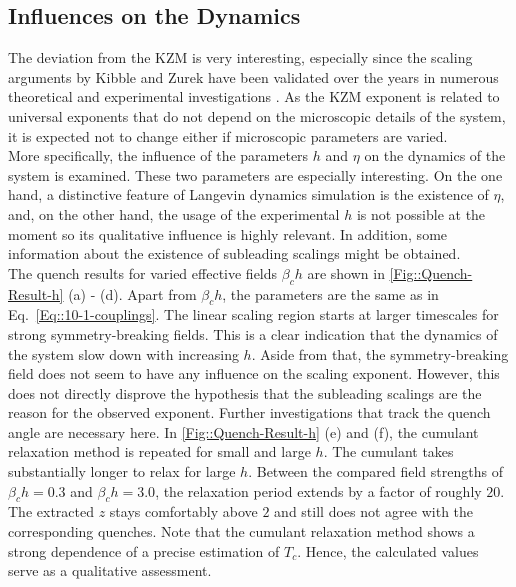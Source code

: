 	\subsection{Influences on the Dynamics}
	The deviation from the KZM is very interesting, especially since the scaling arguments by Kibble and Zurek have been validated over the years in numerous theoretical and experimental investigations \cite{ruutu1996vortex, ulm2013observation, pyka2013topological, schaller2023sequential}. As the KZM exponent is related to universal exponents that do not depend on the microscopic details of the system, it is expected not to change either if microscopic parameters are varied. \\
	
	More specifically, the influence of the parameters $h$ and $\eta$ on the dynamics of the system is examined. These two parameters are especially interesting. On the one hand, a distinctive feature of Langevin dynamics simulation is the existence of $\eta$, and, on the other hand, the usage of the experimental $h$ is not possible at the moment so its qualitative influence is highly relevant. In addition, some information about the existence of subleading scalings \cite{ladewig2020kibble} might be obtained. \\
	
	
	The quench results for varied effective fields $\beta_c h$ are shown in \def\figureautorefname{Figs.}\autoref{Fig::Quench-Result-h}\def\figureautorefname{Fig.} (a) - (d). Apart from $\beta_c h$, the parameters are the same as in Eq.~\eqref{Eq::10-1-couplings}. The linear scaling region starts at larger timescales for strong symmetry-breaking fields. This is a clear indication that the dynamics of the system slow down with increasing $h$. Aside from that, the symmetry-breaking field does not seem to have any influence on the scaling exponent. However, this does not directly disprove the hypothesis that the subleading scalings are the reason for the observed exponent. Further investigations that track the quench angle are necessary here. In \def\figureautorefname{Figs.}\autoref{Fig::Quench-Result-h}\def\figureautorefname{Fig.} (e) and (f), the cumulant relaxation method is repeated for small and large $h$. The cumulant takes substantially longer to relax for large $h$. Between the compared field strengths of $\beta_c h = 0.3$ and $\beta_c h =	3.0$, the relaxation period extends by a factor of roughly $20$. The extracted $z$ stays comfortably above $2$ and still does not agree with the corresponding quenches. Note that the cumulant relaxation method shows a strong dependence of a precise estimation of $T_c$. Hence, the calculated values serve as a qualitative assessment. \\
	
